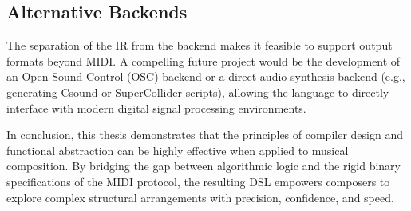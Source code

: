 \subsection{Alternative Backends}\label{subsec:alternative-backends}
The separation of the IR from the backend makes it feasible to support output formats beyond MIDI\@.
A compelling future project would be the development of an Open Sound Control (OSC) backend or a direct audio synthesis
backend (e.g., generating Csound or SuperCollider scripts), allowing the language to directly interface with modern
digital signal processing environments.

\vspace{1cm}
In conclusion, this thesis demonstrates that the principles of compiler design and functional abstraction can be highly
effective when applied to musical composition.
By bridging the gap between algorithmic logic and the rigid binary specifications of the MIDI protocol, the resulting
DSL empowers composers to explore complex structural arrangements with precision, confidence, and speed.
